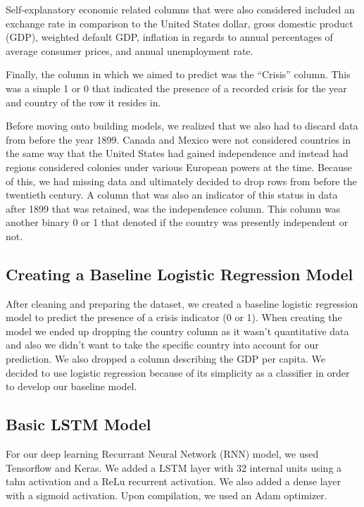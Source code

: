 \documentclass[12pt]{article}
\begin{document}
Self-explanatory economic related columns that were also considered included an exchange rate in comparison to the United States dollar, gross domestic product (GDP), weighted default GDP, inflation in regards to annual percentages of average consumer prices, and annual unemployment rate. 

Finally, the column in which we aimed to predict was the “Crisis” column. This was a simple 1 or 0 that indicated the presence of a recorded crisis for the year and country of the row it resides in.

Before moving onto building models, we realized that we also had to discard data from before the year 1899. Canada and Mexico were not considered countries in the same way that the United States had gained independence and instead had regions considered colonies under various European powers at the time. Because of this, we had missing data and ultimately decided to drop rows from before the twentieth century. A column that was also an indicator of this status in data after 1899 that was retained, was the independence column. This column was another binary 0 or 1 that denoted if the country was presently independent or not.

\subsection{Creating a Baseline Logistic Regression Model}
After cleaning and preparing the dataset, we created a baseline logistic regression model to predict the presence of a crisis indicator (0 or 1). When creating the model we ended up dropping the country column as it wasn’t quantitative data and also we didn’t want to take the specific country into account for our prediction. We also dropped a column describing the GDP per capita. We decided to use logistic regression because of its simplicity as a classifier in order to develop our baseline model.

\subsection{Basic LSTM Model}
For our deep learning Recurrant Neural Network (RNN) model, we used Tensorflow and Keras. We added a LSTM layer with 32 internal units using a tahn activation and a ReLu recurrent activation. We also added a dense layer with a sigmoid activation. Upon compilation, we used an Adam optimizer. 
\end{document}
